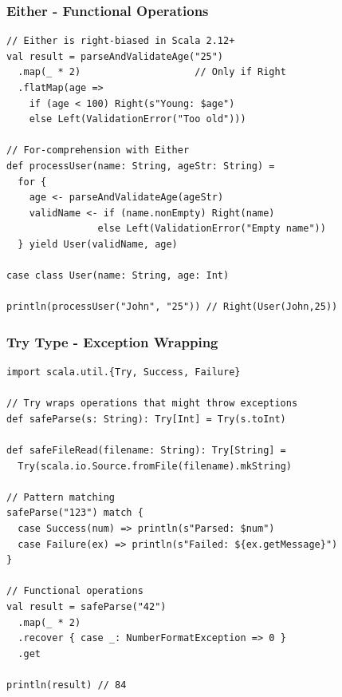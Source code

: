 \documentclass{beamer}
\begin{document}
\begin{frame}[fragile]
\frametitle{Either - Functional Operations}

\begin{lstlisting}[style=scalaStyle]
// Either is right-biased in Scala 2.12+
val result = parseAndValidateAge("25")
  .map(_ * 2)                    // Only if Right
  .flatMap(age => 
    if (age < 100) Right(s"Young: $age")
    else Left(ValidationError("Too old")))

// For-comprehension with Either
def processUser(name: String, ageStr: String) = 
  for {
    age <- parseAndValidateAge(ageStr)
    validName <- if (name.nonEmpty) Right(name) 
                else Left(ValidationError("Empty name"))
  } yield User(validName, age)

case class User(name: String, age: Int)

println(processUser("John", "25")) // Right(User(John,25))
\end{lstlisting}

\end{frame}

\begin{frame}[fragile]
\frametitle{Try Type - Exception Wrapping}

\begin{lstlisting}[style=scalaStyle]
import scala.util.{Try, Success, Failure}

// Try wraps operations that might throw exceptions
def safeParse(s: String): Try[Int] = Try(s.toInt)

def safeFileRead(filename: String): Try[String] = 
  Try(scala.io.Source.fromFile(filename).mkString)

// Pattern matching
safeParse("123") match {
  case Success(num) => println(s"Parsed: $num")
  case Failure(ex) => println(s"Failed: ${ex.getMessage}")
}

// Functional operations
val result = safeParse("42")
  .map(_ * 2)
  .recover { case _: NumberFormatException => 0 }
  .get

println(result) // 84
\end{lstlisting}

\end{frame}
\end{document}
